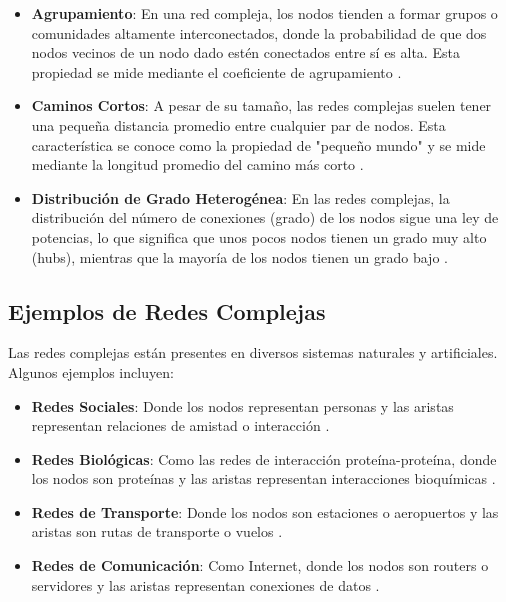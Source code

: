 \begin{itemize}
    \item \textbf{Agrupamiento}: En una red compleja, los nodos tienden a formar grupos o comunidades altamente interconectados, donde la probabilidad de que dos nodos vecinos de un nodo dado estén conectados entre sí es alta. Esta propiedad se mide mediante el coeficiente de agrupamiento \cite{watts1998}.
    \item \textbf{Caminos Cortos}: A pesar de su tamaño, las redes complejas suelen tener una pequeña distancia promedio entre cualquier par de nodos. Esta característica se conoce como la propiedad de "pequeño mundo" y se mide mediante la longitud promedio del camino más corto \cite{watts1998}.
    \item \textbf{Distribución de Grado Heterogénea}: En las redes complejas, la distribución del número de conexiones (grado) de los nodos sigue una ley de potencias, lo que significa que unos pocos nodos tienen un grado muy alto (hubs), mientras que la mayoría de los nodos tienen un grado bajo \cite{barabasi1999}.
\end{itemize}

\subsection{Ejemplos de Redes Complejas}

Las redes complejas están presentes en diversos sistemas naturales y artificiales. Algunos ejemplos incluyen:

\begin{itemize}
    \item \textbf{Redes Sociales}: Donde los nodos representan personas y las aristas representan relaciones de amistad o interacción \citep{wasserman1994}.
    \item \textbf{Redes Biológicas}: Como las redes de interacción proteína-proteína, donde los nodos son proteínas y las aristas representan interacciones bioquímicas \citep{albert2005}.
    \item \textbf{Redes de Transporte}: Donde los nodos son estaciones o aeropuertos y las aristas son rutas de transporte o vuelos \citep{guimera2005}.
    \item \textbf{Redes de Comunicación}: Como Internet, donde los nodos son routers o servidores y las aristas representan conexiones de datos \citep{pastor2004}.
\end{itemize}